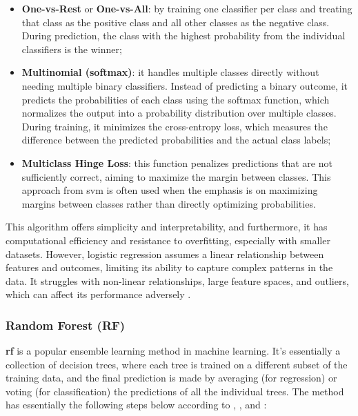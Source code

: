 \begin{itemize}
    \item \textbf{One-vs-Rest} or \textbf{One-vs-All}: by training one classifier per class and treating that class as the positive class and all other classes as the negative class. During prediction, the class with the highest probability from the individual classifiers is the winner;
    \item \textbf{Multinomial (softmax)}: it handles multiple classes directly without needing multiple binary classifiers. Instead of predicting a binary outcome, it predicts the probabilities of each class using the softmax function, which normalizes the output into a probability distribution over multiple classes. During training, it minimizes the cross-entropy loss, which measures the difference between the predicted probabilities and the actual class labels;
    \item \textbf{Multiclass Hinge Loss}: this function penalizes predictions that are not sufficiently correct, aiming to maximize the margin between classes. This approach from \gls{svm} is often used when the emphasis is on maximizing margins between classes rather than directly optimizing probabilities.
\end{itemize}

This algorithm offers simplicity and interpretability, and furthermore, it has computational efficiency and resistance to overfitting, especially with smaller datasets. However, logistic regression assumes a linear relationship between features and outcomes, limiting its ability to capture complex patterns in the data. It struggles with non-linear relationships, large feature spaces, and outliers, which can affect its performance adversely \cite{Russel2010}.


\subsubsection{Random Forest (RF)}
\label{subsubsec:machine_learning_random_forest}

\textbf{\gls{rf}} is a popular ensemble learning method in machine learning. It's essentially a collection of decision trees, where each tree is trained on a different subset of the training data, and the final prediction is made by averaging (for regression) or voting (for classification) the predictions of all the individual trees. The method has essentially the following steps below according to \textcite{Breiman2001}, \textcite{Hartshorn2016}, and \textcite{Genuer2020}:

